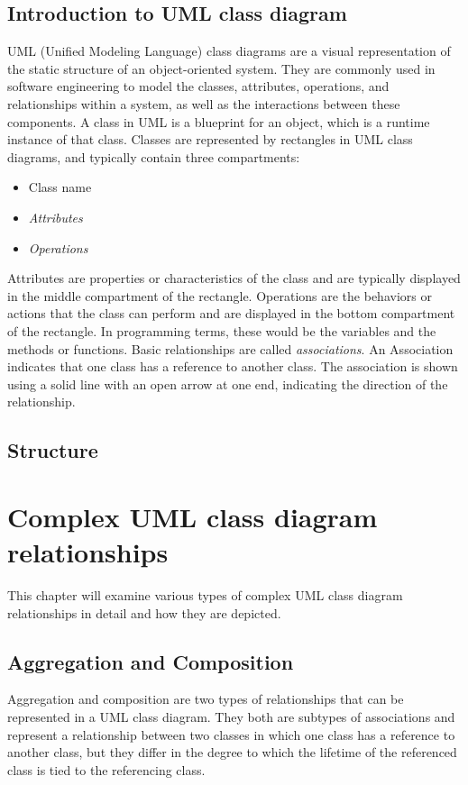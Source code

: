 \documentclass[
	12pt,
    a4paper,
    egregdoesnotlikesansseriftitles, %
    toc=chapterentrywithdots,
    oneside, openany,
    titlepage,
    parskip=half,
    headings=normal,  %
    listof=totoc,
    bibliography=totoc,
    index=totoc,
    captions=tableheading,  %
    listof=flat,
    numbers=noenddot, %
    final]
    {scrbook}
\begin{document}
\section{Introduction to UML class diagram}
UML (Unified Modeling Language) class diagrams are a visual representation of the static structure of an object-oriented system. 
They are commonly used in software engineering to model the classes, attributes, operations, and relationships within a system, as well as the interactions between these components. 
A class in UML is a blueprint for an object, which is a runtime instance of that class. 
Classes are represented by rectangles in UML class diagrams, and typically contain three compartments: 
\begin{itemize}
	\item Class name
	\item \emph{Attributes}
	\item \emph{Operations}
\end{itemize}
Attributes are properties or characteristics of the class and are typically displayed in the middle compartment of the rectangle.
Operations are the behaviors or actions that the class can perform and are displayed in the bottom compartment of the rectangle.
In programming terms, these would be the variables and the methods or functions.
Basic relationships are called \emph{associations}. 
An Association indicates that one class has a reference to another class. \cite[p. 108-111]{uml}
The association is shown using a solid line with an open arrow at one end, indicating the direction of the relationship. \cite[p. 142-143]{uml}

\section{Structure}

\chapter{Complex UML class diagram relationships}
This chapter will examine various types of complex UML class diagram relationships in detail and how they are depicted.


\section{Aggregation and Composition}
Aggregation and composition are two types of relationships that can be represented in a UML class diagram. 
They both are subtypes of associations and represent a relationship between two classes in which one class has a reference to another class, but they differ in the degree to which the lifetime of the referenced class is tied to the referencing class.
\end{document}
